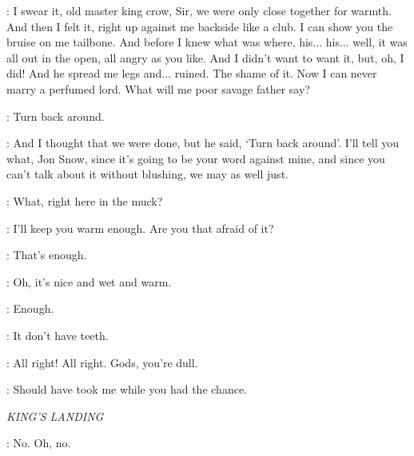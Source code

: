 
\YGRITTE: I swear it, old master king crow, Sir, we were only close together for warmth. And then I felt it, right up against me backside like a club. I can show you the bruise on me tailbone. And before I knew what was where, his$\ldots$ his$\ldots$ well, it was all out in the open, all angry as you like. And I didn't want to want it, but, oh, I did! And he spread me legs and$\ldots$ ruined. The shame of it. Now I can never marry a perfumed lord. What will me poor savage father say?

\JON: Turn back around.

\YGRITTE:  And I thought that we were done, but he said, `Turn back around'. I'll tell you what, Jon Snow, since it's going to be your word against mine, and since you can't talk about it without blushing, we may as well just.

\JON: What, right here in the muck?

\YGRITTE: I'll keep you warm enough. Are you that afraid of it?


\JON: That's enough.

\YGRITTE:  Oh, it's nice and wet and warm.

\JON: Enough.

\YGRITTE: It don't have teeth.


\YGRITTE: All right! All right. Gods, you're dull.



\YGRITTE: Should have took me while you had the chance.


\scene

\textit{KING'S LANDING}


\SANSA: No. Oh, no.

